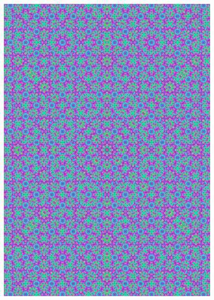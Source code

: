 \documentclass[text.tex]{subfiles}
\begin{document}
\begin{figure}[h!]
\centering
\includegraphics[width=1\textwidth]{img/results/circle8/quasi_circle_241421_(0_1alpha_1).pdf}
\end{figure}

\clearpage
\restoregeometry
\end{document}
